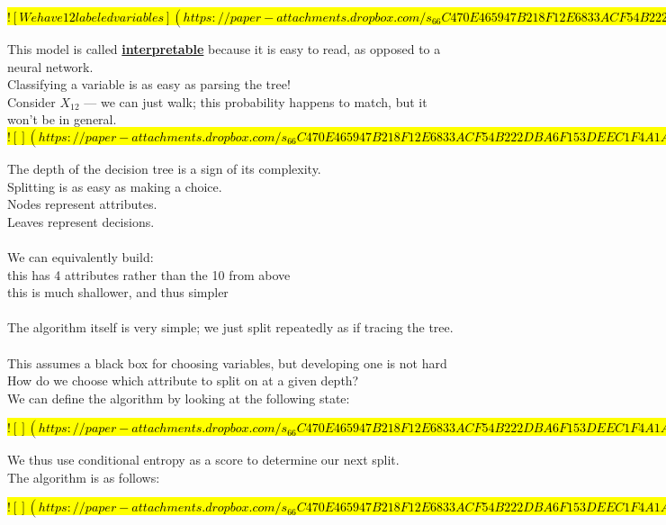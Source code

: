 \documentclass[../../lecture_notes.tex]{subfiles}
\begin{document}
\hl{
$![We have 12 labeled variables](https://paper-attachments.dropbox.com/s_66C470E465947B218F12E6833ACF54B222DBA6F153DEEC1F4A1A4D06909A7A0F_1590914176982_Screen+Shot+2020-05-31+at+1.34.17+AM.png)$
}

\noindent This model is called \textbf{\underline{interpretable}} 
	because it is easy to read, as opposed to a neural network.\\
Classifying a variable is as easy as parsing the tree!\\
	\indent Consider $X_{12}$ — we can just walk; this probability happens to match, but it won’t be in general.\\

\hl{
$![](https://paper-attachments.dropbox.com/s_66C470E465947B218F12E6833ACF54B222DBA6F153DEEC1F4A1A4D06909A7A0F_1590914410089_Screen+Shot+2020-05-31+at+1.34.28+AM.png)$
}

\noindent The depth of the decision tree is a sign of its complexity.\\
Splitting is as easy as making a choice.\\
Nodes represent attributes.\\
Leaves represent decisions.\\
\\
We can equivalently build:\\
	\indent this has 4 attributes rather than the 10 from above\\
	\indent this is much shallower, and thus simpler\\
\\
The algorithm itself is very simple; we just split repeatedly as if tracing the tree.\\
\\
This assumes a black box for choosing variables, but developing one is not hard\\
How do we choose which attribute to split on at a given depth?\\
We can define the algorithm by looking at the following state:

\hl{
$![](https://paper-attachments.dropbox.com/s_66C470E465947B218F12E6833ACF54B222DBA6F153DEEC1F4A1A4D06909A7A0F_1590915632068_Untitled+drawing+14.jpg)$
}

\noindent We thus use conditional entropy as a score to determine our next split.\\

The algorithm is as follows:

\hl{
$![](https://paper-attachments.dropbox.com/s_66C470E465947B218F12E6833ACF54B222DBA6F153DEEC1F4A1A4D06909A7A0F_1590986583122_Untitled+drawing+15.jpg)$
}
\end{document}
